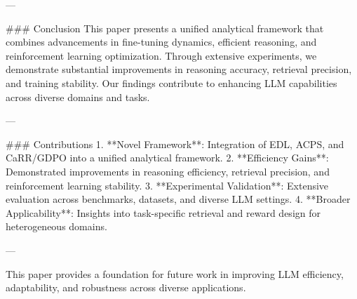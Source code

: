 ---

### Conclusion  
This paper presents a unified analytical framework that combines advancements in fine-tuning dynamics, efficient reasoning, and reinforcement learning optimization. Through extensive experiments, we demonstrate substantial improvements in reasoning accuracy, retrieval precision, and training stability. Our findings contribute to enhancing LLM capabilities across diverse domains and tasks.  

---

### Contributions  
1. **Novel Framework**: Integration of EDL, ACPS, and CaRR/GDPO into a unified analytical framework.  
2. **Efficiency Gains**: Demonstrated improvements in reasoning efficiency, retrieval precision, and reinforcement learning stability.  
3. **Experimental Validation**: Extensive evaluation across benchmarks, datasets, and diverse LLM settings.  
4. **Broader Applicability**: Insights into task-specific retrieval and reward design for heterogeneous domains.  

--- 

This paper provides a foundation for future work in improving LLM efficiency, adaptability, and robustness across diverse applications.